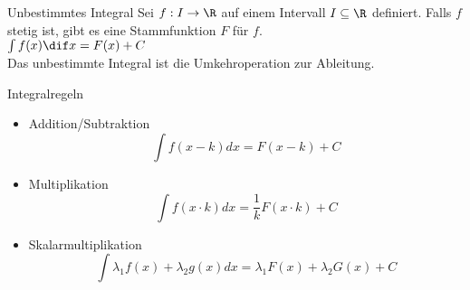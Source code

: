 
\begin{definition}{Unbestimmtes Integral}
    Sei $f: I \to \R$ auf einem Intervall $I \subseteq \R$ definiert.
    Falls $f$ stetig ist, gibt es eine Stammfunktion $F$ für $f$.\\
    $\int f(x) \dif x = F(x) + C$\\
    Das unbestimmte Integral ist die Umkehroperation zur Ableitung.
\end{definition}

\begin{concept}{Integralregeln}
    \begin{itemize}
      \item Addition/Subtraktion
      $$\int f(x-k) d x=F(x-k)+C$$
      \item Multiplikation
      $$\int f(x \cdot k) d x=\frac{1}{k} F(x \cdot k)+C$$
      \item Skalarmultiplikation
      $$\int \lambda_{1} f(x)+\lambda_{2} g(x) d x=\lambda_{1} F(x)+\lambda_{2} G(x)+C$$
    \end{itemize}
\end{concept}   

